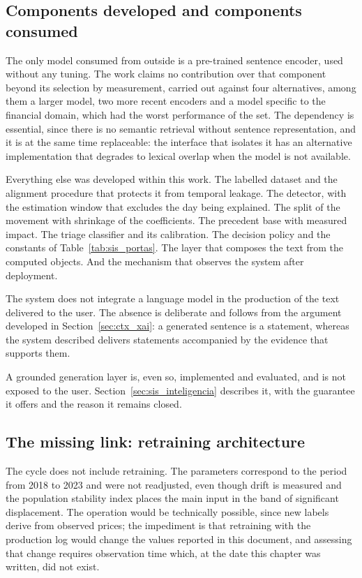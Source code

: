 \subsection{Components developed and components consumed}

The only model consumed from outside is a pre-trained sentence encoder, used without any tuning.
The work claims no contribution over that component beyond its selection by measurement, carried
out against four alternatives, among them a larger model, two more recent encoders and a model
specific to the financial domain, which had the worst performance of the set. The dependency is
essential, since there is no semantic retrieval without sentence representation, and it is at the
same time replaceable: the interface that isolates it has an alternative implementation that
degrades to lexical overlap when the model is not available.

Everything else was developed within this work. The labelled dataset and the alignment procedure
that protects it from temporal leakage. The detector, with the estimation window that excludes the
day being explained. The split of the movement with shrinkage of the coefficients. The precedent
base with measured impact. The triage classifier and its calibration. The decision policy and the
constants of Table~\ref{tab:sis_portas}. The layer that composes the text from the computed
objects. And the mechanism that observes the system after deployment.

The system does not integrate a language model in the production of the text delivered to the
user. The absence is deliberate and follows from the argument developed in
Section~\ref{sec:ctx_xai}: a generated sentence is a statement, whereas the system described
delivers statements accompanied by the evidence that supports them.

A grounded generation layer is, even so, implemented and evaluated, and is not exposed to the user. Section~\ref{sec:sis_inteligencia} describes it, with the guarantee it offers and the reason it remains closed.

\subsection{The missing link: retraining architecture}

The cycle does not include retraining. The parameters correspond to the period from 2018 to 2023
and were not readjusted, even though drift is measured and the population stability index places
the main input in the band of significant displacement. The operation would be technically
possible, since new labels derive from observed prices; the impediment is that retraining with the
production log would change the values reported in this document, and assessing that change
requires observation time which, at the date this chapter was written, did not exist.

